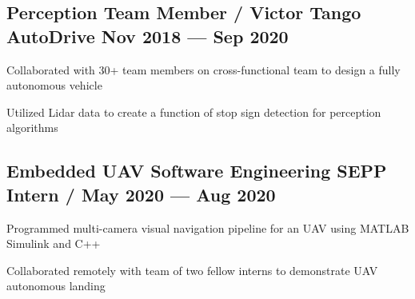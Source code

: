 \subsection{{Perception Team Member / Victor Tango AutoDrive \hfill Nov 2018 --- Sep 2020}}
\begin{zitemize}
	\item Collaborated with 30+ team members on cross-functional team to design a fully autonomous vehicle
	\item Utilized Lidar data to create a function of stop sign detection for perception algorithms
\end{zitemize}

\subsection{{Embedded UAV Software Engineering SEPP Intern /  \hfill May 2020 --- Aug 2020}}
\begin{zitemize}
	\item Programmed multi-camera visual navigation pipeline for an UAV using MATLAB Simulink and C++
	\item Collaborated remotely with team of two fellow interns to demonstrate UAV autonomous landing
\end{zitemize}


